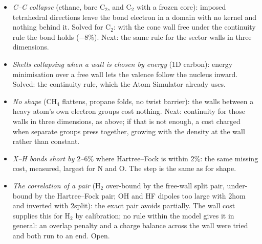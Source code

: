 \documentclass[11pt]{article}
\begin{document}
\begin{itemize}
\item \emph{C--C collapse} (ethane, bare C$_2$, and C$_2$ with a frozen core): imposed tetrahedral directions leave the
  bond electron in a domain with no kernel and nothing behind it. Solved for C$_2$: with the cone wall free under the
  continuity rule the bond holds ($-8\%$). Next: the same rule for the sector walls in three dimensions.
\item \emph{Shells collapsing when a wall is chosen by energy} (1D carbon): energy minimisation over a free wall lets the
  valence follow the nucleus inward. Solved: the continuity rule, which the Atom Simulator already uses.
\item \emph{No shape} (CH$_4$ flattens, propane folds, no twist barrier): the walls between a heavy atom's own electron
  groups cost nothing. Next: continuity for those walls in three dimensions, as above; if that is not enough, a cost
  charged when separate groups press together, growing with the density at the wall rather than constant.
\item \emph{X--H bonds short by $2$--$6\%$} where Hartree--Fock is within $2\%$: the same missing cost, measured, largest
  for N and O. The step is the same as for shape.
\item \emph{The correlation of a pair} (H$_2$ over-bound by the free-wall split pair, under-bound by the
  Hartree--Fock pair; OH and HF dipoles too large with 2hom and inverted with 2split): the exact pair avoids
  partially. The wall cost supplies this for H$_2$ by calibration; no rule within the model gives it in general:
  an overlap penalty and a charge balance across the wall were tried and both run to an end. Open.
\end{itemize}
\end{document}
